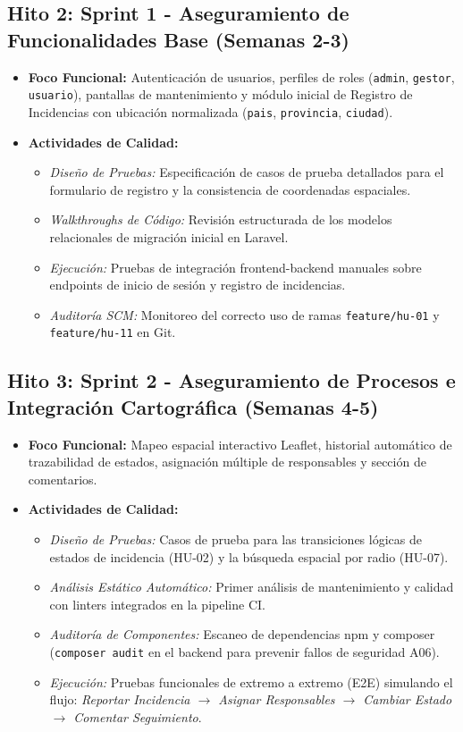 \subsection*{Hito 2: Sprint 1 - Aseguramiento de Funcionalidades Base (Semanas 2-3)}
\begin{itemize}
    \item \textbf{Foco Funcional:} Autenticación de usuarios, perfiles de roles (\texttt{admin}, \texttt{gestor}, \texttt{usuario}), pantallas de mantenimiento y módulo inicial de Registro de Incidencias con ubicación normalizada (\texttt{pais}, \texttt{provincia}, \texttt{ciudad}).
    \item \textbf{Actividades de Calidad:}
    \begin{itemize}
        \item \textit{Diseño de Pruebas:} Especificación de casos de prueba detallados para el formulario de registro y la consistencia de coordenadas espaciales.
        \item \textit{Walkthroughs de Código:} Revisión estructurada de los modelos relacionales de migración inicial en Laravel.
        \item \textit{Ejecución:} Pruebas de integración frontend-backend manuales sobre endpoints de inicio de sesión y registro de incidencias.
        \item \textit{Auditoría SCM:} Monitoreo del correcto uso de ramas \texttt{feature/hu-01} y \texttt{feature/hu-11} en Git.
    \end{itemize}
\end{itemize}

\subsection*{Hito 3: Sprint 2 - Aseguramiento de Procesos e Integración Cartográfica (Semanas 4-5)}
\begin{itemize}
    \item \textbf{Foco Funcional:} Mapeo espacial interactivo Leaflet, historial automático de trazabilidad de estados, asignación múltiple de responsables y sección de comentarios.
    \item \textbf{Actividades de Calidad:}
    \begin{itemize}
        \item \textit{Diseño de Pruebas:} Casos de prueba para las transiciones lógicas de estados de incidencia (HU-02) y la búsqueda espacial por radio (HU-07).
        \item \textit{Análisis Estático Automático:} Primer análisis de mantenimiento y calidad con linters integrados en la pipeline CI.
        \item \textit{Auditoría de Componentes:} Escaneo de dependencias npm y composer (\texttt{composer audit} en el backend para prevenir fallos de seguridad A06).
        \item \textit{Ejecución:} Pruebas funcionales de extremo a extremo (E2E) simulando el flujo: \textit{Reportar Incidencia $\rightarrow$ Asignar Responsables $\rightarrow$ Cambiar Estado $\rightarrow$ Comentar Seguimiento}.
    \end{itemize}
\end{itemize}

